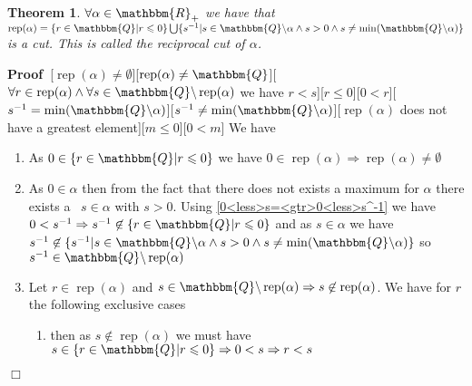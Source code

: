 \documentclass{book}
\newcommand{\nin}{\not\in}
\newcommand{\nobracket}{}
\newcommand{\tmop}[1]{\ensuremath{\operatorname{#1}}}
\newenvironment{proof}{\noindent\textbf{Proof\ }}{\hspace*{\fill}$\Box$\medskip}
\newtheorem{theorem}{Theorem}
\begin{document}
{{\begin{theorem}
  \label{reciprocal cut}{}$\forall \alpha \in
  \mathbbm{R}_+$ we have that $\tmop{rep} (\alpha) = \{ r \in \mathbbm{Q} | r
  \leqslant 0 \nobracket \} \bigcup \{ s^{- 1} | s \in \mathbbm{Q} \backslash
  \alpha \nobracket \wedge s > 0 \wedge s \neq \min (\mathbbm{Q} \backslash
  \alpha) \}$ is a cut. This is called the reciprocal cut of $\alpha$.
\end{theorem}

\begin{proof}[$\tmop{rep} (\alpha) \neq \emptyset$][$\tmop{rep} (\alpha) \neq
\mathbbm{Q}$][$\forall r \in \tmop{rep} (\alpha) \wedge \forall s \in
\mathbbm{Q} \backslash \tmop{rep} (\alpha)$ we have $r < s$][$r \leqslant
0$][$0 < r$][$s^{- 1} = \min (\mathbbm{Q} \backslash \alpha)$][$s^{- 1} \neq
\min (\mathbbm{Q} \backslash \alpha)$][$\tmop{rep} (\alpha)$ does not have a
greatest element][$m \leqslant 0$][$0 < m$]
  We have
  \begin{enumerate}
    \item As $0 \in \{ r \in \mathbbm{Q} | r \leqslant 0 \nobracket \}$ we
    have $0 \in \tmop{rep} (\alpha) \Rightarrow \tmop{rep} (\alpha) \neq
    \emptyset$
    
    \item As $0 \in \alpha$ then from the fact that there does not exists a
    maximum for $\alpha$ there exists a \ $s \in \alpha$ with $s > 0$. Using
    \ref{0<less>s=<gtr>0<less>s^-1} we have $0 < s^{- 1} \Rightarrow s^{- 1}
    \nin \{ r \in \mathbbm{Q} | r \leqslant 0 \nobracket \}$ and as $s \in
    \alpha$ we have $s^{- 1} \nin \{ s^{- 1} | s \in \mathbbm{Q} \backslash
    \alpha \nobracket \wedge s > 0 \wedge s \neq \min (\mathbbm{Q} \backslash
    \alpha) \}$ so $s^{- 1} \in \mathbbm{Q} \backslash \tmop{rep} (\alpha)$
    
    \item Let $r \in \tmop{rep} (\alpha)$ and $s \in \mathbbm{Q} \backslash
    \tmop{rep} (\alpha) \Rightarrow s \nin \tmop{rep} (\alpha)$. We have for
    $r$ the following exclusive cases
    \begin{enumerate}
      \item then as $s \nin \tmop{rep} (\alpha)$ we must have $s \in \{ r \in
      \mathbbm{Q} | r \leqslant 0 \nobracket \} \Rightarrow 0 < s \Rightarrow
      r < s$
      

\end{enumerate}
\end{enumerate}
\end{proof}}}
\end{document}

